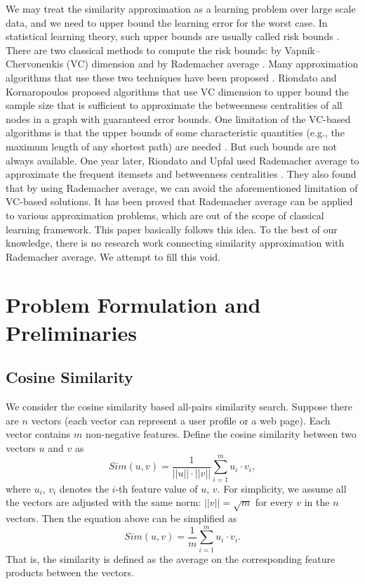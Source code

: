 \documentclass[sigconf,anonymous]{acmart}
\begin{document}
We may treat the similarity approximation as a learning problem over large scale data, and we need to upper bound the learning error for the worst case. In statistical learning theory, such upper bounds are usually called risk bounds \cite{Vap13}. There are two classical methods to compute the risk bounds: by Vapnik–Chervonenkis (VC) dimension \cite{VLL94,Vap98,Vap13} and by Rademacher average \cite{Mohri09,BM02,BBM05}. Many approximation algorithms that use these two techniques have been proposed \cite{RK14,RK16,RU15,RU16}. Riondato and Kornaropoulos \cite{RK14,RK16} proposed algorithms that use VC dimension to upper bound the sample size that is sufficient to approximate the betweenness centralities \cite{Bran01} of all nodes in a graph with guaranteed error bounds. One limitation of the VC-based algorithms is that the upper bounds of some characteristic quantities (e.g., the maximum length of any shortest path) are needed \cite{RK14,RK16,RU16}. But such bounds are not always available. One year later, Riondato and Upfal used Rademacher average to approximate the frequent itemsets \cite{RU15} and betweenness centralities \cite{RU16}. They also found that by using Rademacher average, we can avoid the aforementioned limitation of VC-based solutions. It has been proved that Rademacher average can be applied to various approximation problems, which are out of the scope of classical learning framework. This paper basically follows this idea. To the best of our knowledge, there is no research work connecting similarity approximation with Rademacher average. We attempt to fill this void.

\section{Problem Formulation and Preliminaries}
\label{sec:pp}
\subsection{Cosine Similarity}
We consider the cosine similarity based all-pairs similarity search.
Suppose there are $n$ vectors (each vector can represent a user profile or a web page). Each vector contains $m$ non-negative features. Define the cosine similarity between two vectors $u$ and $v$ as
$$Sim(u,v) = \frac{1}{||u||\cdot||v||} \sum_{i=1}^m u_i\cdot v_i,$$
where $u_i$, $v_i$ denotes the $i$-th feature value of $u$, $v$.
For simplicity, we assume all the vectors are adjusted with the same norm: $||v|| = \sqrt{m}$ for every $v$ in the $n$ vectors. Then the equation above can be simplified as
$$Sim(u,v) = \frac{1}{m} \sum_{i=1}^m u_i\cdot v_i.$$
That is, the similarity is defined as the average on the corresponding feature products between the vectors. 
\end{document}
